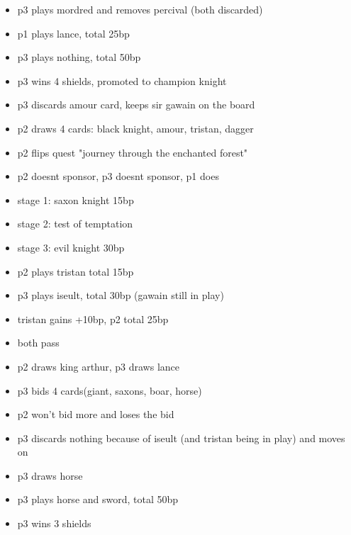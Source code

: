 \documentclass[11pt]{article}
\begin{document}
\begin{enumerate}
\begin{itemize}
	\item p3 plays mordred and removes percival (both discarded)
	\item p1 plays lance, total 25bp
	\item p3 plays nothing, total 50bp
	\item p3 wins 4 shields, promoted to champion knight
	\item p3 discards amour card, keeps sir gawain on the board
	\item p2 draws 4 cards: black knight, amour, tristan, dagger
	\item p2 flips quest "journey through the enchanted forest"
	\item p2 doesnt sponsor, p3 doesnt sponsor, p1 does
	\item stage 1: saxon knight 15bp
	\item stage 2: test of temptation
	\item stage 3: evil knight 30bp
	\item p2 plays tristan total 15bp
	\item p3 plays iseult, total 30bp (gawain still in play)
	\item tristan gains +10bp, p2 total 25bp
	\item both pass
	\item p2 draws king arthur, p3 draws lance
	\item p3 bids 4 cards(giant, saxons, boar, horse)
	\item p2 won't bid more and loses the bid
	\item p3 discards nothing because of iseult (and tristan being in play) and moves on
	\item p3 draws horse
	\item p3 plays horse and sword, total 50bp
	\item p3 wins 3 shields
	\end{itemize}
\end{enumerate}
\end{document}

